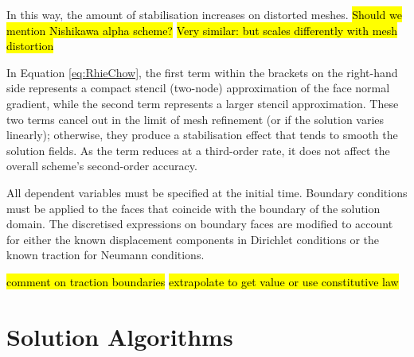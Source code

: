 \documentclass[sn-mathphys,Numbered]{sn-jnl}%
\newcommand{\bb}{\boldsymbol}
\begin{document}
In this way, the amount of stabilisation increases on distorted meshes.
\hl{Should we mention Nishikawa alpha scheme?} \hl{Very similar: but scales differently with mesh distortion}

In Equation \ref{eq:RhieChow}, the first term within the brackets on the right-hand side represents a compact stencil (two-node) approximation of the face normal gradient, while the second term represents a larger stencil approximation.
These two terms cancel out in the limit of mesh refinement (or if the solution varies linearly); otherwise, they produce a stabilisation effect that tends to smooth the solution fields.
As the term reduces at a third-order rate, it does not affect the overall scheme's second-order accuracy.

All dependent variables must be specified at the initial time.
Boundary conditions must be applied to the faces that coincide with the boundary of the solution domain.
The discretised expressions on boundary faces are modified to account for either the known displacement components in Dirichlet conditions or the known traction for Neumann conditions.



\hl{comment on traction boundaries} \hl{extrapolate to get value or use constitutive law}



\section{Solution Algorithms}\label{sec:sol_alg}


\end{document}
